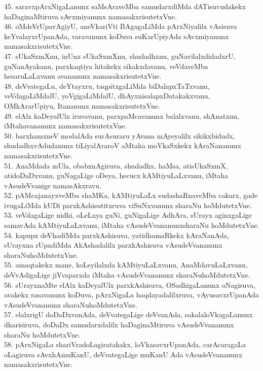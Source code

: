 \documentclass{article}
\begin{document}
45. saravxpArxNigaLanunx saMsAraveMba samudarxdiMda dATisuvudakekx haDaginaMtiruva sAvxmiyanunx namasakxrisutetxVne.\\
46. oMdeVrUpavAgiyU, aneVkariVti BAgagaLiMda pArxNiyalilx vAsisuva keYvalayxrUpanAda, varavanunx koDuva suKarUpiyAda sAvxmiyanunx namasakxrisutetxVne.\\
47. sUkaSxmXnu, inUnx sUkaSxmXnu, shudadhxnu, guNavilalxdidadxrU, guNanAyakanu, parxkaqtiya hitakekx sikakxdavanu, veVdaveMba hesaruLaLxvanu avananunx namasakxrisutetxVne.\\
48. deVvategaLu, deYtayxru, taqpitxgaLiMda biDalapxTaTxvanu, veVdagaLiMdalU, yoVgigaLiMdalU, dhAyxnisalapxDatakakxvanu, OMkArarUpiyu, Itananunx namasakxrisutetxVne.\\
49. elAlx kaDeyalUlx iruvavanu, parxpaMcavanunx balalxvanu, shAnatxnu, iMtahavananunx namasakxrisutetxVne.\\
50. barxhamxneV modalAda surAsuraru yAvana mAyeyalilx sikikxbidudx, shudadhxvAdudanunx tiLiyalAraroV aMtaha moVkaSxkekx kAraNananunx namasakxrisutetxVne.\\
51. AnaMdada mUla, obabxnAgiruva, shudadhx, haMsa, atisUkaSxmX, atidoDaDxvanu, guNagaLige oDeya, hecucx kAMtiyuLaLxvanu, iMtaha vAsudeVvanige namasAkxravu.\\
52. pAMcajanayxveMba shaMKa, kAMtiyuLaLx sudashaRnaveMba cakarx, gade ivugaLiMda kUDi parxkAshisutitxruva viSuNxvanunx sharaNu hoMdutetxVne.\\
53. veVdagaLige nidhi, oLeLxya guNi, guNigaLige AdhAra, sUrayx aginxgaLige samavAda kAMtiyuLaLxvanu, iMtaha vAsudeVvananunxsharaNu hoMdutetxVne.\\
54. kapupx deVhadiMda parxkAshisuva, yatidhamaRkekx kAraNanAda, sUrayxna rUpadiMda AkAshadalilx parxkAshisuva vAsudeVvananunx sharaNuhoMdutetxVne.\\
55. amaqtakekx mane, koLeyilalxda kAMtiyuLaLxvanu, AnaMdavuLaLxvanu, deVvAdigaLige jiVvaparxda iMtaha vAsudeVvananunx sharaNuhoMdutetxVne.\\
56. sUrayxnaMte elAlx kaDeyalUlx parxkAshisuva, OSadhigaLanunx oNagisuva, avakekx rasavanunx koDuva, pArxNigaLa haqdayadalilxruva, vAyusavxrUpanAda vAsudeVvananunx sharaNuhoMdutetxVne.\\
57. elalxrigU doDaDxvanAda, deVvategaLige deVvanAda, sakalaloVkagaLanunx dharisiruva, doDaDx samudarxdalilx haDaginaMtiruva vAsudeVvananunx sharaNu hoMdutetxVne.\\
58. pArxNigaLa shariVradoLagiratakakx, loVkasavxrUpanAda, carAcaragaLa oLagiruva sAvxhAmuKanU, deVvategaLige muKanU Ada vAsudeVvananunx namasakxrisutetxVne.\\
\end{document}
